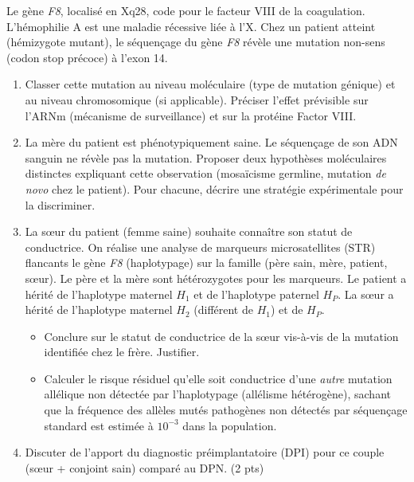 \documentclass[11pt]{article}
\begin{document}
\begin{exercice}
Le gène \textit{F8}, localisé en Xq28, code pour le facteur VIII de la coagulation. L'hémophilie A est une maladie récessive liée à l'X.
Chez un patient atteint (hémizygote mutant), le séquençage du gène \textit{F8} révèle une mutation non-sens (codon stop précoce) à l'exon 14.
\begin{enumerate}
\item Classer cette mutation au niveau moléculaire (type de mutation génique) et au niveau chromosomique (si applicable). Préciser l'effet prévisible sur l'ARNm (mécanisme de surveillance) et sur la protéine Factor VIII.
\item La mère du patient est phénotypiquement saine. Le séquençage de son ADN sanguin ne révèle pas la mutation. Proposer deux hypothèses moléculaires distinctes expliquant cette observation (mosaïcisme germline, mutation \textit{de novo} chez le patient). Pour chacune, décrire une stratégie expérimentale pour la discriminer.
\item La sœur du patient (femme saine) souhaite connaître son statut de conductrice. On réalise une analyse de marqueurs microsatellites (STR) flancants le gène \textit{F8} (haplotypage) sur la famille (père sain, mère, patient, sœur). Le père et la mère sont hétérozygotes pour les marqueurs. Le patient a hérité de l'haplotype maternel $H_1$ et de l'haplotype paternel $H_P$. La sœur a hérité de l'haplotype maternel $H_2$ (différent de $H_1$) et de $H_P$.
\begin{itemize}
\item Conclure sur le statut de conductrice de la sœur vis-à-vis de la mutation identifiée chez le frère. Justifier.
\item Calculer le risque résiduel qu'elle soit conductrice d'une \textit{autre} mutation allélique non détectée par l'haplotypage (allélisme hétérogène), sachant que la fréquence des allèles mutés pathogènes non détectés par séquençage standard est estimée à $10^{-3}$ dans la population.
\end{itemize}
\item Discuter de l'apport du diagnostic préimplantatoire (DPI) pour ce couple (sœur + conjoint sain) comparé au DPN. (2 pts)
\end{enumerate}
\end{exercice}
\end{document}
